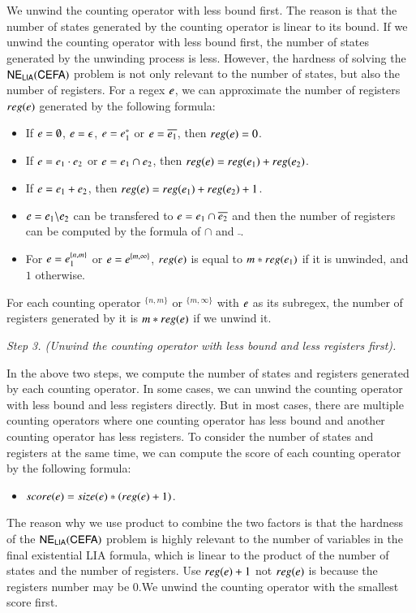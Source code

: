 We unwind the counting operator with less bound first. The reason is that the number of states generated by the counting operator is linear to its bound. If we unwind the counting operator with less bound first, the number of states generated by the unwinding process is less. However, the hardness of solving the ${\sf NE_{LIA}(CEFA)}$ problem is not only relevant to the number of states, but also the number of registers. For a regex $e$, we can approximate the number of registers $reg(e)$ generated by the following formula:
\begin{itemize}
  \item If $e = \emptyset$, $e = \epsilon$, $e = e_1^*$ or $e = \overline{e_1}$, then $reg(e) = 0$.
  \item If $e = e_1\cdot e_2$ or $e = e_1 \cap e_2$, then $reg(e) = reg(e_1) + reg(e_2)$.
  \item If $e = e_1 + e_2$, then $reg(e) = reg(e_1) + reg(e_2) + 1$.
  \item $e = e_1 \backslash e_2$ can be transfered to $e = e_1 \cap \overline{e_2}$ and then the number of registers can be computed by the formula of $\cap$ and $\bar{}$.
  \item For $e = e_1^{\{n,m\}}$ or $e = e^{\{m, \infty\}}$, $reg(e)$ is equal to $m*reg(e_1)$ if it is unwinded, and $1$ otherwise.
\end{itemize}

For each counting operator $^{\{n,m\}}$ or $^{\{m,\infty\}}$ with $e$ as its subregex, the number of registers generated by it is $m*reg(e)$ if we unwind it.

\medskip
\noindent
\emph{Step 3. (Unwind the counting operator with less bound and less registers first).}

In the above two steps, we compute the number of states and registers generated by each counting operator. In some cases, we can unwind the counting operator with less bound and less registers directly. But in most cases, there are multiple counting operators where one counting operator has less bound and another counting operator has less registers. To consider the number of states and registers at the same time, we can compute the score of each counting operator by the following formula:
\begin{itemize}
  \item $score(e) = size(e) * (reg(e)+1)$.
\end{itemize} 
The reason why we use product to combine the two factors is that the hardness of the ${\sf NE_{LIA}(CEFA)}$ problem is highly relevant to the number of variables in the final existential LIA formula, which is linear to the product of the number of states and the number of registers. Use $reg(e) + 1$ not $reg(e)$ is because the registers number may be $0$.We unwind the counting operator with the smallest score first. 

